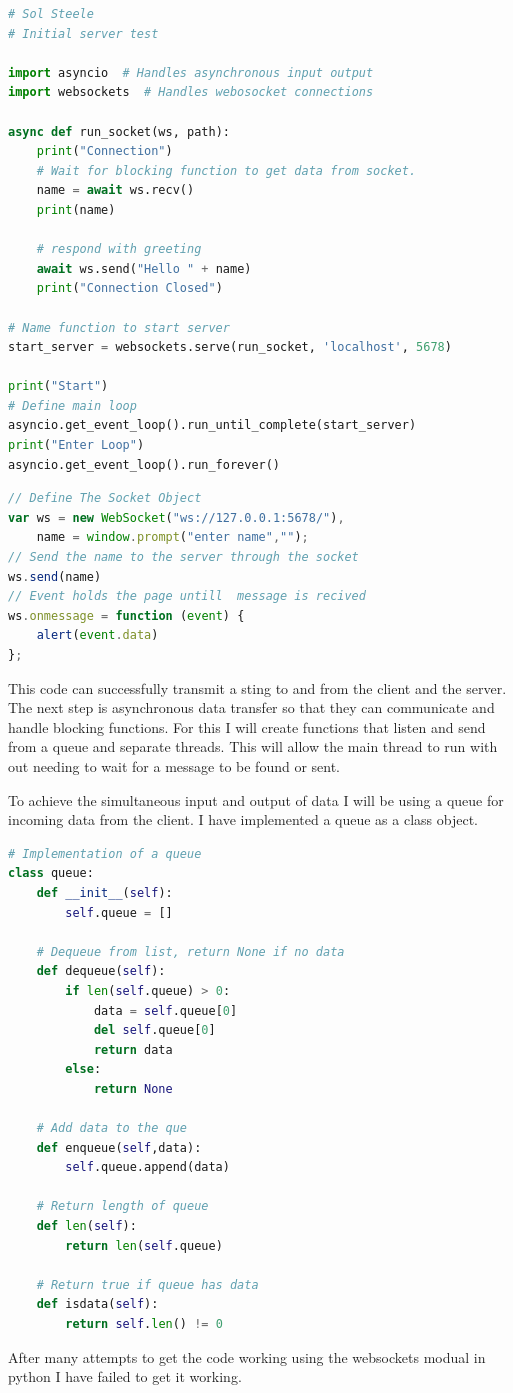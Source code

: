 \documentclass[12pt]{article}
\begin{document}
\begin{lstlisting}[language=Python, caption=Python Server Test]
# Sol Steele
# Initial server test

import asyncio  # Handles asynchronous input output
import websockets  # Handles webosocket connections

async def run_socket(ws, path):
    print("Connection")
    # Wait for blocking function to get data from socket.
    name = await ws.recv()
    print(name)

    # respond with greeting
    await ws.send("Hello " + name)
    print("Connection Closed")

# Name function to start server
start_server = websockets.serve(run_socket, 'localhost', 5678)

print("Start")
# Define main loop
asyncio.get_event_loop().run_until_complete(start_server)
print("Enter Loop")
asyncio.get_event_loop().run_forever()

\end{lstlisting}

\begin{lstlisting}[language=JavaScript, caption=JavaScript Client Test]
// Define The Socket Object
var ws = new WebSocket("ws://127.0.0.1:5678/"),
    name = window.prompt("enter name","");
// Send the name to the server through the socket
ws.send(name)
// Event holds the page untill  message is recived
ws.onmessage = function (event) {
    alert(event.data)
};
\end{lstlisting}

This code can successfully transmit a sting to and from the client and the server. The next step is asynchronous data transfer so that they can communicate and handle blocking functions. For this I will create functions that listen and send from a queue and separate threads. This will allow the main thread to run with out needing to wait for a message to be found or sent.

To achieve the simultaneous input and output of data I will be using a queue for incoming data from the client. I have implemented a queue as a class object.
\begin{lstlisting}[language=Python, caption=Queue Class]
# Implementation of a queue
class queue:
    def __init__(self):
        self.queue = []

    # Dequeue from list, return None if no data
    def dequeue(self):
        if len(self.queue) > 0:
            data = self.queue[0]
            del self.queue[0]
            return data
        else:
            return None
    
    # Add data to the que
    def enqueue(self,data):
        self.queue.append(data)

    # Return length of queue
    def len(self):
        return len(self.queue)

    # Return true if queue has data
    def isdata(self):
        return self.len() != 0
\end{lstlisting}
After many attempts to get the code working using the websockets modual in python I have failed to get it working.
\end{document}
